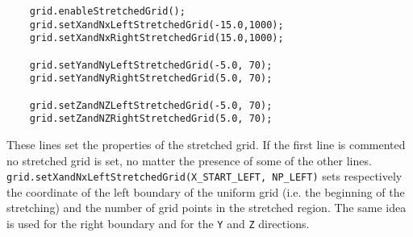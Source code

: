 \documentclass[11pt,a4paper]{report}
\begin{document}
\begin{lstlisting}
	grid.enableStretchedGrid();
	grid.setXandNxLeftStretchedGrid(-15.0,1000);
	grid.setXandNxRightStretchedGrid(15.0,1000);

	grid.setYandNyLeftStretchedGrid(-5.0, 70);
	grid.setYandNyRightStretchedGrid(5.0, 70);

	grid.setZandNZLeftStretchedGrid(-5.0, 70);
	grid.setZandNZRightStretchedGrid(5.0, 70);
\end{lstlisting}
These lines set the properties of the stretched grid.
If the first line is commented no stretched grid is set, no matter the presence of some of the other lines.
\texttt{grid.setXandNxLeftStretchedGrid(X\_START\_LEFT, NP\_LEFT)}
sets respectively the coordinate of the left boundary of the uniform grid (i.e. the beginning of the stretching) and the number of grid points in the stretched region.
The same idea is used for the right boundary and for the \verb+Y+ and \verb+Z+
directions.
\end{document}

